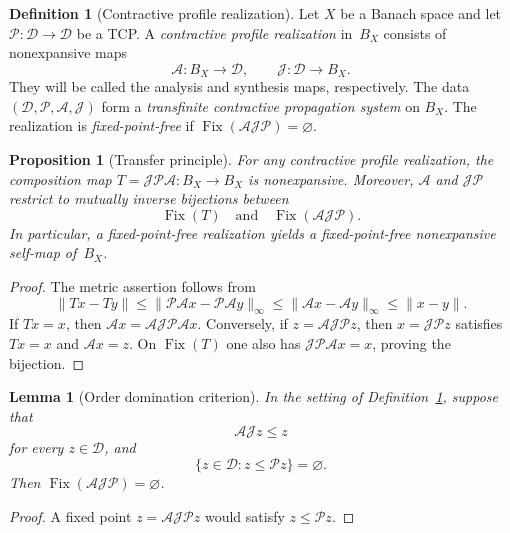 \documentclass[preprint,12pt,nopreprintline]{elsarticle}
\newtheorem{proposition}[theorem]{Proposition}
\newtheorem{lemma}[theorem]{Lemma}
\theoremstyle{definition}
\newtheorem{definition}[theorem]{Definition}
\theoremstyle{remark}
\numberwithin{equation}{section}
\begin{document}
\begin{definition}[Contractive profile realization]
\label{tcp:def:realization}
Let $X$ be a Banach space and let $\mathscr P:\mathcal D\to\mathcal D$ be a TCP. A \emph{contractive profile realization} in~$B_X$ consists of nonexpansive maps
\[
 \mathcal A:B_X\longrightarrow\mathcal D,\qquad \mathcal J:\mathcal D\longrightarrow B_X.
\]
They will be called the analysis and synthesis maps, respectively. The data $(\mathcal D,\mathscr P,\mathcal A,\mathcal J)$ form a \emph{transfinite contractive propagation system} on $B_X$. The realization is \emph{fixed-point-free} if $\operatorname{Fix}(\mathcal A\mathcal J\mathscr P)=\varnothing$.
\end{definition}

\begin{proposition}[Transfer principle]
\label{tcp:prop:transfer}
For any contractive profile realization, the composition map $T=\mathcal J\mathscr P\mathcal A:B_X\to B_X$ is nonexpansive.
Moreover, $\mathcal A$ and $\mathcal J\mathscr P$ restrict to mutually inverse bijections between
\[
 \operatorname{Fix}(T) \quad\text{and}\quad \operatorname{Fix}(\mathcal A\mathcal J\mathscr P).
\]
In particular, a fixed-point-free realization yields a fixed-point-free nonexpansive self-map of~$B_X$.
\end{proposition}

\begin{proof}
The metric assertion follows from
\[
 \|Tx-Ty\|
 \le\|\mathscr P\mathcal Ax-\mathscr P\mathcal Ay\|_\infty
 \le\|\mathcal Ax-\mathcal Ay\|_\infty
 \le\|x-y\|.
\]
If $Tx=x$, then $\mathcal Ax= \mathcal A\mathcal J\mathscr P\mathcal Ax$. Conversely, if $z=\mathcal A\mathcal J\mathscr Pz$, then
$x=\mathcal J\mathscr Pz$ satisfies $Tx=x$ and $\mathcal Ax=z$. On $\operatorname{Fix}(T)$ one also has $\mathcal J\mathscr P\mathcal Ax=x$, proving the bijection.
\end{proof}

\begin{lemma}[Order domination criterion]
\label{tcp:lem:domination}
In the setting of Definition~\ref{tcp:def:realization}, suppose that
\[
\mathcal A\mathcal Jz\le z
\] 
for every $z\in\mathcal D$, and
\[
 \{z\in\mathcal D:z\le\mathscr Pz\}=\varnothing.
\]
Then $\operatorname{Fix}(\mathcal A\mathcal J\mathscr P) =\varnothing$.
\end{lemma}

\begin{proof}
A fixed point $z=\mathcal A\mathcal J\mathscr Pz$ would satisfy $z\le\mathscr Pz$.
\end{proof}
\end{document}
